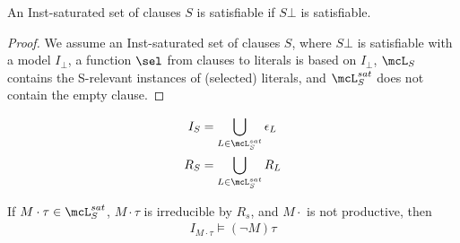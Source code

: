 \begin{theorem}
    An Inst-saturated set of clauses \( S \) is satisfiable if \( S\bot \) is satisfiable.
\end{theorem}



\begin{proof}
    We assume an Inst-saturated set of clauses \( S \),
    where \( S\bot \) is satisfiable with a model \( I_\bot \),
    a function \( \sel \) from clauses to literals is based on \( I_\bot \),
    \( \mcL_S \) contains the S-relevant instances of (selected) literals,
    and \( \mcL_S^{sat} \) does not contain the empty clause.



\end{proof}

\begin{align*}
    I_S &= \bigcup_{L\in\mcL_S^{sat}} \epsilon_L
    \\
    R_S &= \bigcup_{L\in\mcL_S^{sat}} R_L
\end{align*}

\begin{lemma}
    If \( M\cdot\tau \in \mcL_S^{sat} \),
    \( M\cdot\tau \) is irreducible by \( R_s \),
    and \( M\cdot \) is not productive, then
    \begin{gather}
        I_{M\cdot\tau} \models (\lnot M)\tau
    \end{gather}
\end{lemma}




